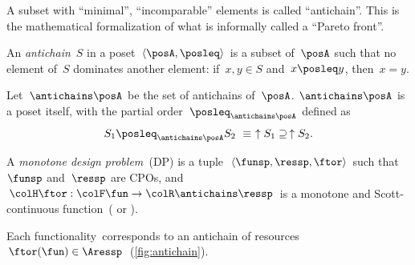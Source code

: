 A subset with ``minimal'', ``incomparable'' elements is called
``antichain''. This is the mathematical formalization of what is
informally called a ``Pareto front''.


\begin{definition}
    An \emph{antichain}~$S$ in a poset~$\left\langle \posA,\posleq\right\rangle $
    is a subset of~$\posA$ such that no element of~$S$ dominates another
    element: if~$x,y\in S$ and~$x\posleq y$, then~$x=y$.
\end{definition}
\begin{lemma}
    Let~$\antichains\posA$ be the set of antichains of~$\posA$. $\antichains\posA$
    is a poset itself, with the partial order~$\posleq_{\antichains\posA}$
    defined as
    \begin{equation}
        S_{1}\posleq_{\antichains\posA}S_{2}\ \equiv\ \uparrow S_{1}\supseteq\,\uparrow S_{2}.\label{eq:orderantichains}
    \end{equation}
\end{lemma}
\begin{definition}
    \label{def:A-monotone-design}A\emph{ monotone design problem~}(DP)
    is a tuple~$\left\langle \funsp,\ressp,\ftor\right\rangle $ such
    that~$\funsp$ and~$\ressp$ are CPOs, and~${\colH\ftor}:{\colF\fun}\rightarrow{\colR\antichains\ressp}$
    is a monotone and Scott-continuous function~(\cite{gierz03continuous}
    or \cite[Definition 11]{censi16codesign_sep16}).
\end{definition}

\noindent Each functionality~\fun corresponds to an antichain
of resources~$\ftor(\fun)\in\Aressp$~(\cref{fig:antichain}).


